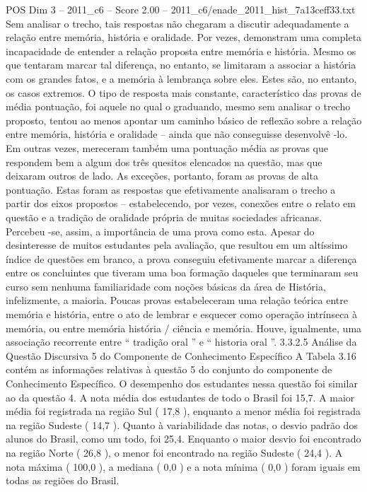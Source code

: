 \begin{textsample}{POS Dim 3 – 2011\_c6 – Score 2.00 – 2011\_c6/enade\_2011\_hist\_7a13ceff33.txt}
Sem analisar o trecho, tais respostas não chegaram a discutir adequadamente a relação entre memória, história e oralidade.
Por vezes, demonstram uma completa incapacidade de entender a relação proposta entre memória e história.
Mesmo os que tentaram marcar tal diferença, no entanto, se limitaram a associar a história com os grandes fatos, e a memória à lembrança sobre eles.
Estes são, no entanto, os casos extremos.
O tipo de resposta mais constante, característico das provas de média pontuação, foi aquele no qual o graduando, mesmo sem analisar o trecho proposto, tentou ao menos apontar um caminho básico de reflexão sobre a relação entre memória, história e oralidade – ainda que não conseguisse desenvolvê -lo.
Em outras vezes, mereceram também uma pontuação média as provas que respondem bem a algum dos três quesitos elencados na questão, mas que deixaram outros de lado.
As exceções, portanto, foram as provas de alta pontuação.
Estas foram as respostas que efetivamente analisaram o trecho a partir dos eixos propostos – estabelecendo, por vezes, conexões entre o relato em questão e a tradição de oralidade própria de muitas sociedades africanas.
Percebeu -se, assim, a importância de uma prova como esta.
Apesar do desinteresse de muitos estudantes pela avaliação, que resultou em um altíssimo índice de questões em branco, a prova conseguiu efetivamente marcar a diferença entre os concluintes que tiveram uma boa formação daqueles que terminaram seu curso sem nenhuma familiaridade com noções básicas da área de História, infelizmente, a maioria.
Poucas provas estabeleceram uma relação teórica entre memória e história, entre o ato de lembrar e esquecer como operação intrínseca à memória, ou entre memória história / ciência e memória.
Houve, igualmente, uma associação recorrente entre “ tradição oral ” e “ historia oral ”. 3.3.2.5 Análise da Questão Discursiva 5 do Componente de Conhecimento Específico A Tabela 3.16 contém as informações relativas à questão 5 do conjunto do componente de Conhecimento Específico.
O desempenho dos estudantes nessa questão foi similar ao da questão 4.
A nota média dos estudantes de todo o Brasil foi 15,7.
A maior média foi registrada na região Sul ( 17,8 ), enquanto a menor média foi registrada na região Sudeste ( 14,7 ).
Quanto à variabilidade das notas, o desvio padrão dos alunos do Brasil, como um todo, foi 25,4.
Enquanto o maior desvio foi encontrado na região Norte ( 26,8 ), o menor foi encontrado na região Sudeste ( 24,4 ).
A nota máxima ( 100,0 ), a mediana ( 0,0 ) e a nota mínima ( 0,0 ) foram iguais em todas as regiões do Brasil.

\end{textsample}
